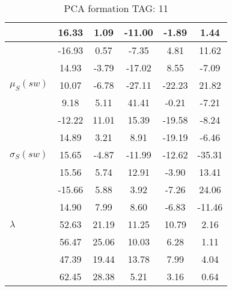\begin{table}[h!]
\begin{center}
\begin{tabular}{| l | c | c | c | c | c |}
 & 16.33  & 1.09  & -11.00  & -1.89  & 1.44 \\\hline
 & -16.93  & 0.57  & -7.35  & 4.81  & 11.62 \\\hline
 & 14.93  & -3.79  & -17.02  & 8.55  & -7.09 \\\hline
$\mu_S(sw)$ & 10.07  & -6.78  & -27.11  & -22.23  & 21.82 \\\hline
 & 9.18  & 5.11  & 41.41  & -0.21  & -7.21 \\\hline
 & -12.22  & 11.01  & 15.39  & -19.58  & -8.24 \\\hline
 & 14.89  & 3.21  & 8.91  & -19.19  & -6.46 \\\hline
$\sigma_S(sw)$ & 15.65  & -4.87  & -11.99  & -12.62  & -35.31 \\\hline
 & 15.56  & 5.74  & 12.91  & -3.90  & 13.41 \\\hline
 & -15.66  & 5.88  & 3.92  & -7.26  & 24.06 \\\hline
 & 14.90  & 7.99  & 8.60  & -6.83  & -11.46 \\\hline
$\lambda$ & 52.63  & 21.19  & 11.25  & 10.79  & 2.16 \\\hline
 & 56.47  & 25.06  & 10.03  & 6.28  & 1.11 \\\hline
 & 47.39  & 19.44  & 13.78  & 7.99  & 4.04 \\\hline
 & 62.45  & 28.38  & 5.21  & 3.16  & 0.64 \\\hline
\end{tabular}
\caption{PCA formation TAG: 11}
\end{center}
\end{table}